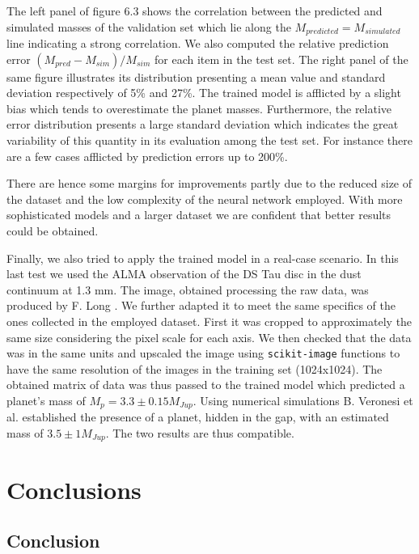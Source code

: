 \documentclass[a4paper,10pt]{report}
\begin{document}
The left panel of figure 6.3 shows the correlation between the predicted and simulated masses of the validation set which
lie along the $M_{predicted} = M_{simulated}$ line indicating a strong correlation.
We also computed the relative prediction error $(M_{pred} - M_{sim})/M_{sim}$ for each item
in the test set. The right panel of the same figure illustrates its distribution
presenting a mean value and standard deviation respectively of 5\% and 27\%.
The trained model is afflicted by a slight bias which tends to overestimate the planet masses.
Furthermore, the relative error distribution presents a large standard deviation which indicates the great
variability of this quantity in its evaluation among the test set. For instance there are a few cases afflicted by
prediction errors up to 200\%.

There are hence some margins for improvements partly due to the reduced size of
the dataset and the low complexity of the neural network employed. With more sophisticated models and
a larger dataset we are confident that better results could be obtained.

Finally, we also tried to apply the trained model in a real-case scenario. In this last test we used
the ALMA observation of the DS Tau disc in the dust continuum at 1.3 mm.
The image, obtained processing the raw data, was produced by F. Long \cite{Long_2018}.
We further adapted it to meet the same specifics of the ones collected in the employed dataset.
First it was cropped to
approximately the same size considering the pixel scale for each axis.
We then checked that the data was in the same units and upscaled the image using
\lstinline{scikit-image} functions to have the same resolution of the images in the training set (1024x1024).
The obtained matrix of data was thus passed to the trained model which predicted a planet's mass of $M_p = 3.3 \pm 0.15 M_{Jup}$.
Using numerical simulations B. Veronesi et al. \cite{dstauv} established the presence of a planet, hidden in the gap, with an estimated
mass of $3.5 \pm 1 M_{Jup}$. The two results are thus compatible.

\chapter{Conclusions}
\section{Conclusion}
\end{document}

